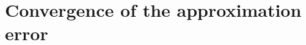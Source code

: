 \documentclass[11pt,a4paper,reqno]{amsart}
\numberwithin{equation}{section}
\theoremstyle{plain}
\theoremstyle{definition}
\newtheorem{example}[theorem]{Example}
\def\ud{\mathrm d}
\newcommand{\R}{\mathbb{R}}
\begin{document}



\section{Convergence of the approximation error}
\label{sec:convergence-NN}
\end{document}
